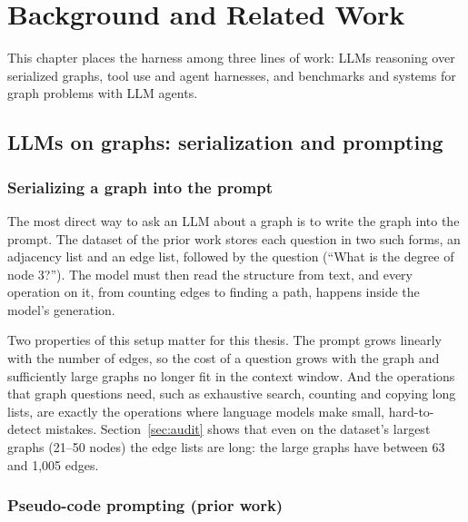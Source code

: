 \chapter{Background and Related Work}
\label{ch:background}

This chapter places the harness among three lines of work: LLMs reasoning over serialized graphs, tool use and agent
harnesses, and benchmarks and systems for graph problems with LLM agents.

\section{LLMs on graphs: serialization and prompting}

\subsection{Serializing a graph into the prompt}

The most direct way to ask an LLM about a graph is to write the graph into the prompt. The dataset of the prior work
stores each question in two such forms, an adjacency list and an edge list, followed by the question
(``What is the degree of node 3?''). The model must then read the structure from text, and every operation on it,
from counting edges to finding a path, happens inside the model's generation.

Two properties of this setup matter for this thesis. The prompt grows linearly with the number of edges, so the cost
of a question grows with the graph and sufficiently large graphs no longer fit in the context window. And the
operations that graph questions need, such as exhaustive search, counting and copying long lists, are exactly the
operations where language models make small, hard-to-detect mistakes. Section~\ref{sec:audit} shows that even on the
dataset's largest graphs (21--50 nodes) the edge lists are long: the large graphs have between 63 and 1,005 edges.

\subsection{Pseudo-code prompting (prior work)}

